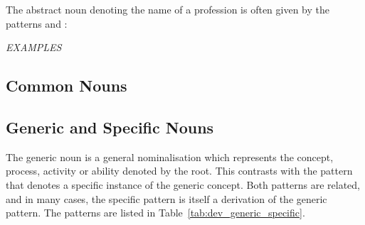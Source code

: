 \documentclass[grammar]{subfiles}
\begin{document}
  The abstract noun denoting the name of a profession is often given by the patterns  and :

  \begin{exe}
    \ex \emph{EXAMPLES}
  \end{exe}

  \subsection{Common Nouns}
  \label{ssec:dev_common_nouns}

  \ToBeWritten

  \subsection{Generic and Specific Nouns}
  \label{ssec:dev_generic_nouns}

  The generic noun is a general nominalisation which represents the concept, process, activity or ability denoted by the root. 
  This contrasts with the pattern that denotes a specific instance of the generic concept. 
  Both patterns are related, and in many cases, the specific pattern is itself a derivation of the generic pattern. 
  The patterns are listed in Table~\ref{tab:dev_generic_specific}.
\end{document}
